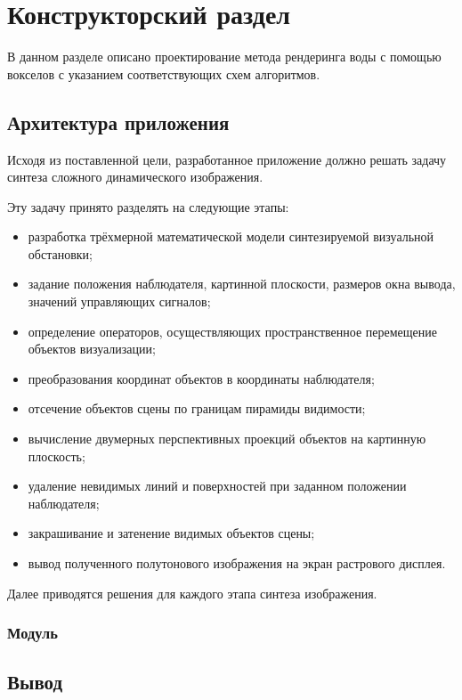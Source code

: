 \chapter{Конструкторский раздел}
\label{cha:design}

В данном разделе описано проектирование метода рендеринга воды с помощью вокселов
с указанием соответствующих схем алгоритмов.

\section{Архитектура приложения}

Исходя из поставленной цели, разработанное приложение должно решать задачу
синтеза сложного динамического изображения.

Эту задачу принято разделять на следующие этапы:
\begin{itemize}
    \item разработка трёхмерной математической модели синтезируемой визуальной
    обстановки;
    \item задание положения наблюдателя, картинной плоскости, размеров окна
    вывода, значений управляющих сигналов;
    \item определение операторов, осуществляющих пространственное перемещение
    объектов визуализации;
    \item преобразования координат объектов в координаты наблюдателя;
    \item отсечение объектов сцены по границам пирамиды видимости;
    \item вычисление двумерных перспективных проекций объектов на картинную плоскость;
    \item удаление невидимых линий и поверхностей при заданном положении наблюдателя;
    \item закрашивание и затенение видимых объектов сцены;
    \item вывод полученного полутонового изображения на экран растрового дисплея.
\end{itemize}

Далее приводятся решения для каждого этапа синтеза изображения.

\subsection{Модуль }
\section{Вывод}


